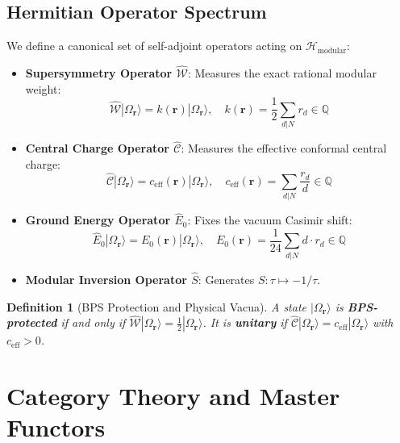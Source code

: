 \documentclass[11pt,twoside,openright]{book}
\newtheorem{definition}[theorem]{Definition}
\begin{document}
\section{Hermitian Operator Spectrum}
We define a canonical set of self-adjoint operators acting on $\mathcal{H}_{\text{modular}}$:
\begin{itemize}
    \item \textbf{Supersymmetry Operator $\hat{\mathcal{W}}$}: Measures the exact rational modular weight:
    \begin{equation}
    \hat{\mathcal{W}} |\Omega_{\mathbf{r}}\rangle = k(\mathbf{r}) |\Omega_{\mathbf{r}}\rangle, \quad k(\mathbf{r}) = \frac{1}{2} \sum_{d|N} r_d \in \mathbb{Q}
    \end{equation}
    \item \textbf{Central Charge Operator $\hat{\mathcal{C}}$}: Measures the effective conformal central charge:
    \begin{equation}
    \hat{\mathcal{C}} |\Omega_{\mathbf{r}}\rangle = c_{\text{eff}}(\mathbf{r}) |\Omega_{\mathbf{r}}\rangle, \quad c_{\text{eff}}(\mathbf{r}) = \sum_{d|N} \frac{r_d}{d} \in \mathbb{Q}
    \end{equation}
    \item \textbf{Ground Energy Operator $\hat{E}_0$}: Fixes the vacuum Casimir shift:
    \begin{equation}
    \hat{E}_0 |\Omega_{\mathbf{r}}\rangle = E_0(\mathbf{r}) |\Omega_{\mathbf{r}}\rangle, \quad E_0(\mathbf{r}) = \frac{1}{24} \sum_{d|N} d \cdot r_d \in \mathbb{Q}
    \end{equation}
    \item \textbf{Modular Inversion Operator $\hat{S}$}: Generates $S : \tau \mapsto -1/\tau$.
\end{itemize}

\begin{definition}[BPS Protection and Physical Vacua]
A state $|\Omega_{\mathbf{r}}\rangle$ is \textbf{BPS-protected} if and only if $\hat{\mathcal{W}} |\Omega_{\mathbf{r}}\rangle = \frac{1}{2} |\Omega_{\mathbf{r}}\rangle$. It is \textbf{unitary} if $\hat{\mathcal{C}} |\Omega_{\mathbf{r}}\rangle = c_{\text{eff}} |\Omega_{\mathbf{r}}\rangle$ with $c_{\text{eff}} > 0$.
\end{definition}

\chapter{Category Theory and Master Functors}
\end{document}
